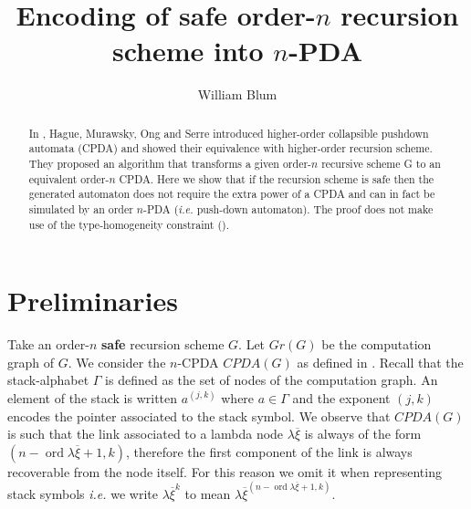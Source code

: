 \documentclass{article}
\author{William Blum}
\title{Encoding of safe order-$n$ recursion scheme into $n$-PDA}
\newcommand{\ord}{\mathop{\mathrm{ord}}}
\theoremstyle{remark}
\theoremstyle{definition}
\begin{document}
\maketitle
\begin{abstract}
In \cite{hague-sto07}, Hague, Murawsky, Ong and Serre introduced
higher-order collapsible pushdown automata (CPDA) and showed their
equivalence with higher-order recursion scheme. They proposed an
algorithm that transforms a given order-$n$ recursive  scheme G to
an equivalent order-$n$ CPDA. Here we show that if the recursion
scheme is safe then the generated automaton does not require the
extra power of a CPDA and can in fact be simulated by an order
$n$-PDA ({\it i.e.} push-down automaton). The proof does not make
use of the type-homogeneity constraint (\cite{KNU02}).
\end{abstract}


\section{Preliminaries}

Take an order-$n$ {\bf safe} recursion scheme $G$. Let $Gr(G)$ be the computation graph of $G$.
We consider the $n$-CPDA $CPDA(G)$ as defined in \cite[Definition 5.2]{hague-sto07}.
Recall that the stack-alphabet $\Gamma$ is defined as the set of nodes of the computation graph.
An element of the stack is written $a^{(j,k)}$ where $a\in \Gamma$ and the exponent $(j,k)$
encodes the pointer associated to the stack symbol. We observe that $CPDA(G)$ is such that the link associated to a lambda node $\lambda \overline{\xi}$ is always of the form $(n-\ord{\lambda \overline{\xi}}+1, k)$, therefore the first component of the link is always recoverable from the node itself. For this reason we omit it when representing stack symbols {\it i.e.} we write $\lambda \overline{\xi}^{k}$ to mean $\lambda \overline{\xi}^{(n-\ord{\lambda \overline{\xi}}+1,k)}$.
\end{document}
